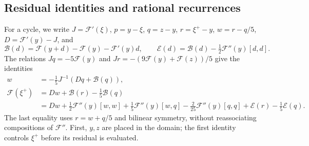 \documentclass[11pt,a4paper]{article}
\numberwithin{equation}{section}
\numberwithin{table}{section}
\theoremstyle{plain}
\theoremstyle{definition}\newtheorem{definition}[theorem]{Definition}
\theoremstyle{remark}\newtheorem{remark}[theorem]{Remark}
\begin{document}
\subsection{Residual identities and rational recurrences}
For a cycle, we write $J=\mathcal F'(\xi)$, $p=y-\xi$, $q=z-y$,
$r=\xi^+-y$, $w=r-q/5$, $D=\mathcal F'(y)-J$, and
\[
 \mathcal B(d)=\mathcal F(y+d)-\mathcal F(y)-\mathcal F'(y)d,
 \qquad \mathcal E(d)=\mathcal B(d)-\tfrac12\mathcal F''(y)[d,d].
\]
The relations $Jq=-5\mathcal F(y)$ and
$Jr=-(9\mathcal F(y)+\mathcal F(z))/5$ give the identities
\begin{equation}
 \begin{aligned}
 w&=-\tfrac15J^{-1}(Dq+\mathcal B(q)),\\
 \mathcal F(\xi^+)&=Dw+\mathcal B(r)-\tfrac15\mathcal B(q)\\
 &=Dw+\tfrac12\mathcal F''(y)[w,w]+\tfrac15\mathcal F''(y)[w,q]
   -\tfrac2{25}\mathcal F''(y)[q,q]+\mathcal E(r)-\tfrac15\mathcal E(q).
 \end{aligned}\label{supp:eq:residual-identities}
\end{equation}
The last equality uses $r=w+q/5$ and bilinear symmetry, without
reassociating compositions of $\mathcal F''$. First, $y,z$ are placed
in the domain; the first identity controls $\xi^+$ before its
residual is evaluated.
\end{document}
